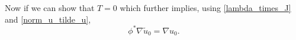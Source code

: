 \documentclass[a4paper, 10pt, twoside, notitlepage]{amsart}
\theoremstyle{plain}
\newcommand{\Om}{\Omega}
\numberwithin{equation}{section}
\newcommand {\p} {\partial}
\newcommand{\tre}{\textcolor{red}}
\newcommand{\abs}[1]{\lvert #1 \rvert}
\begin{document}
Now if we can show that $T=0$ which further implies, using \eqref{lambda_times_J} and \eqref{norm_u_tilde_u},
\begin{equation}\label{relation_u_tilde_u_3}
	\phi^*\nabla\tilde u_0=\nabla u_0.
\end{equation}
\end{document}
